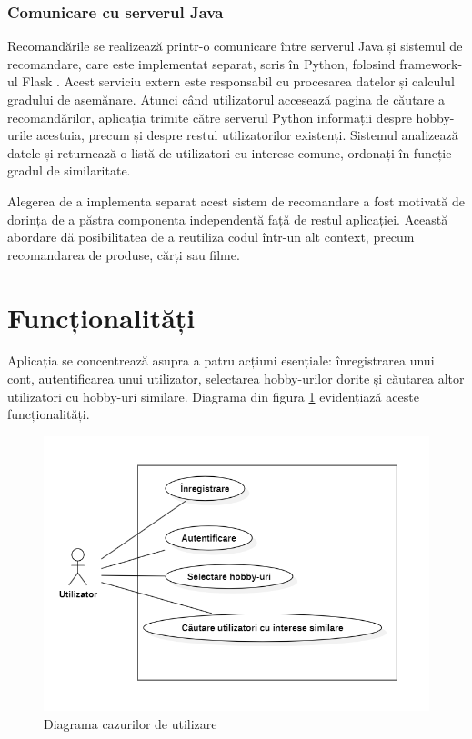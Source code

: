 \subsubsection*{Comunicare cu serverul Java}
Recomandările se realizează printr-o comunicare între serverul Java și sistemul de recomandare, care este implementat separat, scris în Python, folosind framework-ul Flask \cite{flaskdocs}.
Acest serviciu extern este responsabil cu procesarea datelor și calculul gradului de asemănare.
Atunci când utilizatorul accesează pagina de căutare a recomandărilor, aplicația trimite către serverul Python informații despre hobby-urile acestuia, precum și despre restul utilizatorilor existenți.
Sistemul analizează datele și returnează o listă de utilizatori cu interese comune, ordonați în funcție gradul de similaritate.
\par
Alegerea de a implementa separat acest sistem de recomandare a fost motivată de dorința de a păstra componenta independentă față de restul aplicației.
Această abordare dă posibilitatea de a reutiliza codul într-un alt context, precum recomandarea de produse, cărți sau filme.

\section{Funcționalități}
\label{sec:ch4sec2}

Aplicația se concentrează asupra a patru acțiuni esențiale: înregistrarea unui cont, autentificarea unui utilizator, selectarea hobby-urilor dorite și căutarea altor utilizatori cu hobby-uri similare.
Diagrama din figura \ref{FigUseCaseDiagram} evidențiază aceste funcționalități.

\begin{figure}[htbp]
	\centering
    \includegraphics[scale=0.60]{./figures/usecase-diagram.png}
	\caption{Diagrama cazurilor de utilizare}
	\label{FigUseCaseDiagram}
\end{figure}

